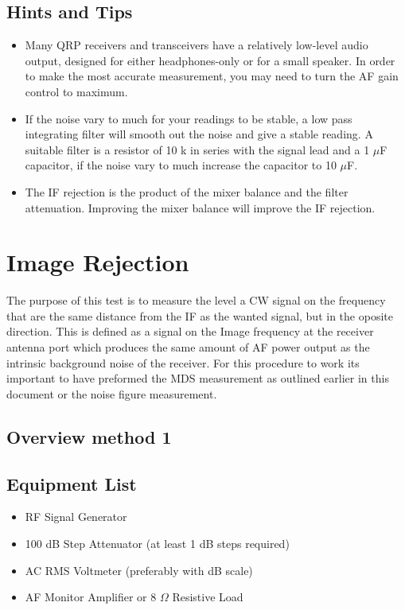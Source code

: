 \documentclass[10pt,letterpaper]{book}
\begin{document}
\subsection*{Hints and Tips}
\begin{itemize}
	\item Many QRP receivers and transceivers have a relatively low-level audio output, designed for either headphones-only or for a small speaker. In order to make the most accurate measurement, you may need to turn the AF gain control to maximum.
	\item If the noise vary to much for your readings to be stable, a low pass integrating filter will smooth out the noise and give a stable reading. A suitable filter is a resistor of 10 k in series with the signal lead and a 1 $\mu$F capacitor, if the noise vary to much increase the capacitor to 10 $\mu$F.  
	\item The IF rejection is the product of the mixer balance and the filter attenuation. Improving the mixer balance will improve the IF rejection.
\end{itemize}
\newpage

\section{Image Rejection}
The purpose of this test is to measure the level a CW signal on the frequency that are the same distance from the IF as the wanted signal, but in the oposite direction. 
This is defined as a signal on the Image frequency at the receiver antenna port which produces the same amount of AF power output as the intrinsic background noise of the receiver.  For this procedure to work its important to have preformed the MDS measurement as outlined earlier in this document or the noise figure measurement.
\subsection*{Overview method 1}
\subsection*{Equipment List}
\begin{itemize}
	\item RF Signal Generator
	\item 100 dB Step Attenuator (at least 1 dB steps required)
	\item AC RMS Voltmeter (preferably with dB scale)
	\item AF Monitor Amplifier or 8 $\Omega$ Resistive Load
\end{itemize}
\end{document}
